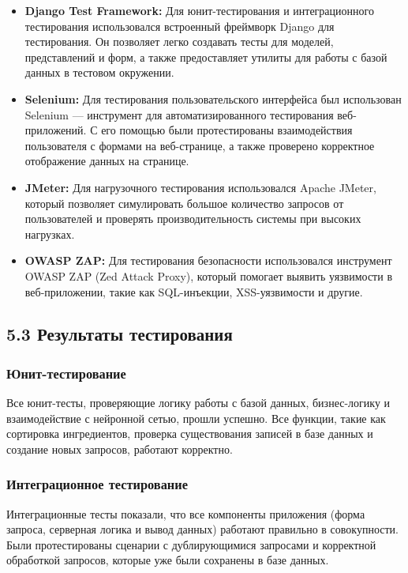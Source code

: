 {\begin{itemize}
    \item \textbf{Django Test Framework:} Для юнит-тестирования и интеграционного тестирования использовался встроенный фреймворк Django для тестирования. Он позволяет легко создавать тесты для моделей, представлений и форм, а также предоставляет утилиты для работы с базой данных в тестовом окружении.
    \item \textbf{Selenium:} Для тестирования пользовательского интерфейса был использован Selenium — инструмент для автоматизированного тестирования веб-приложений. С его помощью были протестированы взаимодействия пользователя с формами на веб-странице, а также проверено корректное отображение данных на странице.
    \item \textbf{JMeter:} Для нагрузочного тестирования использовался Apache JMeter, который позволяет симулировать большое количество запросов от пользователей и проверять производительность системы при высоких нагрузках.
    \item \textbf{OWASP ZAP:} Для тестирования безопасности использовался инструмент OWASP ZAP (Zed Attack Proxy), который помогает выявить уязвимости в веб-приложении, такие как SQL-инъекции, XSS-уязвимости и другие.
\end{itemize}

\subsection*{5.3 Результаты тестирования}

\subsubsection*{Юнит-тестирование}
Все юнит-тесты, проверяющие логику работы с базой данных, бизнес-логику и взаимодействие с нейронной сетью, прошли успешно. Все функции, такие как сортировка ингредиентов, проверка существования записей в базе данных и создание новых запросов, работают корректно.

\subsubsection*{Интеграционное тестирование}
Интеграционные тесты показали, что все компоненты приложения (форма запроса, серверная логика и вывод данных) работают правильно в совокупности. Были протестированы сценарии с дублирующимися запросами и корректной обработкой запросов, которые уже были сохранены в базе данных.

}
